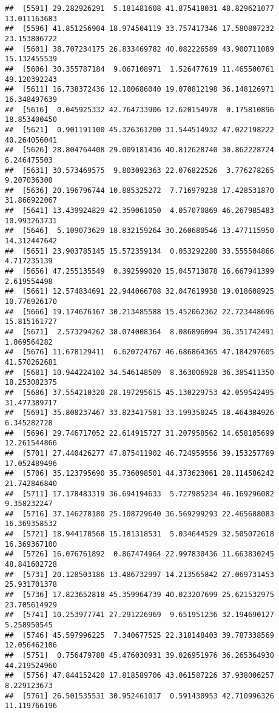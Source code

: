 \documentclass[
]{article}
\begin{document}
\begin{verbatim}
##  [5591] 29.282926291  5.181481608 41.875418031 48.829621077 13.011163683
##  [5596] 41.851256904 18.974504119 33.757417346 17.580807232 23.153806722
##  [5601] 38.707234175 26.833469782 40.082226589 43.900711089 15.132455539
##  [5606] 30.355787184  9.067108971  1.526477619 11.465500761 49.120392243
##  [5611] 16.738372436 12.100686040 19.070812198 36.148126971 16.348497639
##  [5616]  0.045925332 42.764733906 12.620154978  0.175810896 18.853400450
##  [5621]  0.901191100 45.326361200 31.544514932 47.022198222 40.264056041
##  [5626] 28.804764408 29.009181436 40.812628740 30.862228724  6.246475503
##  [5631] 30.573469575  9.803092363 22.076822526  3.776278265  9.207036300
##  [5636] 20.196796744 10.885325272  7.716979238 17.428531870 31.866922067
##  [5641] 13.439924829 42.359061050  4.057070869 46.267985483 10.993263731
##  [5646]  5.109073629 18.832159264 30.260680546 13.477115950 14.312447642
##  [5651] 23.903785145 15.572359134  0.053292280 33.555504866  4.717235139
##  [5656] 47.255135549  0.392599020 15.045713878 16.667941399  2.619554498
##  [5661] 12.574834691 22.944066708 32.047619938 19.018608925 10.776926170
##  [5666] 19.174676167 30.213485588 15.452062362 22.723448696 15.815161727
##  [5671]  2.573294262 38.074008364  8.086896094 36.351742491  1.869564282
##  [5676] 11.678129411  6.620724767 46.686864365 47.184297605 41.570262681
##  [5681] 10.944224102 34.546148509  8.363006928 36.385411350 18.253082375
##  [5686] 37.554210320 28.197295615 45.130229753 42.059542495 31.477389717
##  [5691] 35.808237467 33.823417581 33.199350245 18.464384926  6.345282728
##  [5696] 29.746717052 22.614915727 31.207958562 14.658105699 12.261544866
##  [5701] 27.440426277 47.875411902 46.724959556 39.153257769 17.052489496
##  [5706] 35.123795690 35.736098501 44.373623061 28.114586242 21.742846840
##  [5711] 17.178483319 36.694194633  5.727985234 46.169296082  9.358232247
##  [5716] 37.146278180 25.108729640 36.569299293 22.465688083 16.369358532
##  [5721] 18.944178568 15.181318531  5.034644529 32.505072618 16.369367100
##  [5726] 16.076761892  0.867474964 22.997830436 11.663830245 48.841602728
##  [5731] 20.128503186 13.486732997 14.213565842 27.069731453 25.931701378
##  [5736] 17.823652818 45.359964739 40.023207699 25.621532975 23.705614929
##  [5741] 10.253977741 27.291226969  9.651951236 32.194690127  5.258950545
##  [5746] 45.597996225  7.340677525 22.318148403 39.787338569 12.056462106
##  [5751]  0.756479788 45.476030931 39.026951976 36.265364930 44.219524960
##  [5756] 47.844152420 17.818589706 43.061587226 37.938006257  8.229123673
##  [5761] 26.501535531 30.952461017  0.591430953 42.710996326 11.119766196

\end{verbatim}
\end{document}
